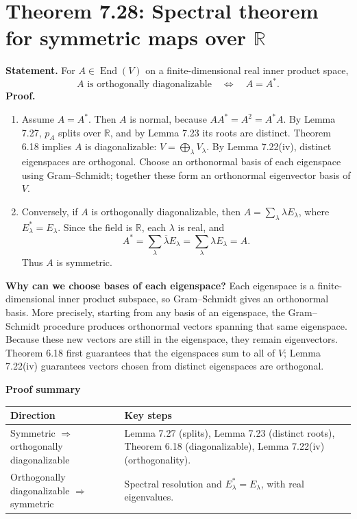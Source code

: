 \documentclass[11pt,a4paper]{article}
\newenvironment{proofsteps}{\begin{enumerate}\setlength{\itemsep}{4pt}}{\end{enumerate}}
\newcommand{\prooftable}[1]{\medskip\textbf{Proof summary}\par\smallskip #1\medskip}
\begin{document}
\section{Theorem 7.28: Spectral theorem for symmetric maps over \(\mathbb R\)}
\textbf{Statement.} For \(A\in\operatorname{End}(V)\) on a finite-dimensional real inner product space,
\[
\boxed{A\text{ is orthogonally diagonalizable}\quad\Longleftrightarrow\quad A=A^*.}
\]
\textbf{Proof.}
\begin{proofsteps}
\item Assume \(A=A^*\). Then \(A\) is normal, because
\(AA^*=A^2=A^*A\).
By Lemma 7.27, \(p_A\) splits over \(\mathbb R\), and by Lemma 7.23 its roots are distinct.
Theorem 6.18 implies \(A\) is diagonalizable:
\(V=\bigoplus_\lambda V_\lambda\).
By Lemma 7.22(iv), distinct eigenspaces are orthogonal.
Choose an orthonormal basis of each eigenspace using Gram--Schmidt; together these form an orthonormal eigenvector basis of \(V\).
\item Conversely, if \(A\) is orthogonally diagonalizable, then
\(A=\sum_\lambda\lambda E_\lambda\), where \(E_\lambda^*=E_\lambda\).
Since the field is \(\mathbb R\), each \(\lambda\) is real, and
\[
A^*=\sum_\lambda\overline\lambda E_\lambda
=\sum_\lambda\lambda E_\lambda=A.
\]
Thus \(A\) is symmetric.
\end{proofsteps}
\begin{personalnote}

\textbf{Why can we choose bases of each eigenspace?}
Each eigenspace is a finite-dimensional inner product subspace, so Gram--Schmidt gives an orthonormal basis. More precisely, starting from any basis of an eigenspace, the Gram--Schmidt procedure produces orthonormal vectors spanning that same eigenspace. Because these new vectors are still in the eigenspace, they remain eigenvectors. Theorem 6.18 first guarantees that the eigenspaces sum to all of \(V\); Lemma 7.22(iv) guarantees vectors chosen from distinct eigenspaces are orthogonal.
\end{personalnote}
\prooftable{\begin{tabularx}{\linewidth}{@{}p{.29\linewidth}X@{}}\hline
Direction & Key steps\\\hline
Symmetric \(\Rightarrow\) orthogonally diagonalizable & Lemma 7.27 (splits), Lemma 7.23 (distinct roots), Theorem 6.18 (diagonalizable), Lemma 7.22(iv) (orthogonality).\\
Orthogonally diagonalizable \(\Rightarrow\) symmetric & Spectral resolution and \(E_\lambda^*=E_\lambda\), with real eigenvalues.\\\hline
\end{tabularx}}
\end{document}
